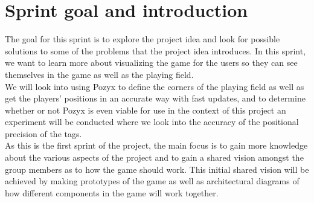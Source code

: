 \section{Sprint goal and introduction}\label{sec:sprint1-goals}
The goal for this sprint is to explore the project idea and look for possible solutions to some of the problems that the project idea introduces.
In this sprint, we want to learn more about visualizing the game for the users so they can see themselves in the game as well as the playing field. \\
We will look into using Pozyx to define the corners of the playing field as well as get the players' positions in an accurate way with fast updates, and to determine whether or not Pozyx is even viable for use in the context of this project an experiment will be conducted where we look into the accuracy of the positional precision of the tags. \\
As this is the first sprint of the project, the main focus is to gain more knowledge about the various aspects of the project and to gain a shared vision amongst the group members as to how the game should work.
This initial shared vision will be achieved by making prototypes of the game as well as architectural diagrams of how different components in the game will work together.

